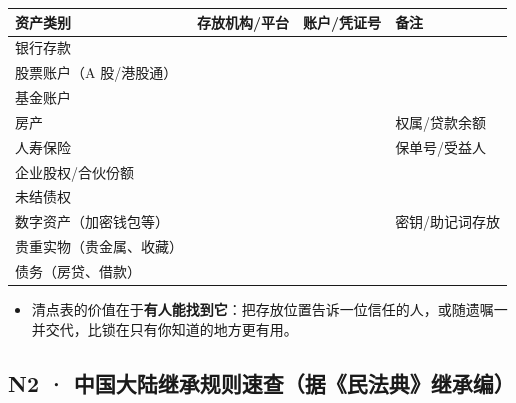 \documentclass[a4paper,11pt,oneside,fontset=none,UTF8,zihao=-4]{ctexbook}
\providecommand{\tightlist}{\setlength{\itemsep}{2pt}\setlength{\parskip}{1pt}}
\begin{document}
\begin{longtable}[]{@{}llll@{}}
\toprule\noalign{}\rowcolor{dh-pink!25}
资产类别 & 存放机构/平台 & 账户/凭证号 & 备注 \\
\midrule\noalign{}
\endhead
\bottomrule\noalign{}
\endlastfoot
银行存款 & & & \\
股票账户（A 股/港股通） & & & \\
基金账户 & & & \\
房产 & & & 权属/贷款余额 \\
人寿保险 & & & 保单号/受益人 \\
企业股权/合伙份额 & & & \\
未结债权 & & & \\
数字资产（加密钱包等） & & & 密钥/助记词存放 \\
贵重实物（贵金属、收藏） & & & \\
债务（房贷、借款） & & & \\
\end{longtable}

\begin{itemize}
\tightlist
\item
  清点表的价值在于\textbf{有人能找到它}：把存放位置告诉一位信任的人，或随遗嘱一并交代，比锁在只有你知道的地方更有用。
\end{itemize}

\subsection{N2 ·
中国大陆继承规则速查（据《民法典》继承编）}\label{n2-ux4e2dux56fdux5927ux9646ux7ee7ux627fux89c4ux5219ux901fux67e5ux636eux6c11ux6cd5ux5178ux7ee7ux627fux7f16}
\end{document}

